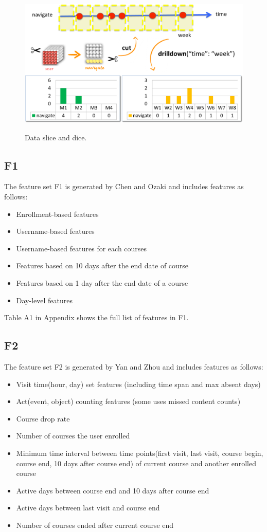 \begin{figure}[!t]
	\centering
	\includegraphics[width=0.5 \textwidth]{slice_and_dice}
	\label{fig:slice}
	\caption{Data slice and dice.}
\end{figure}

\subsection{F1}

The feature set F1 is generated by Chen and Ozaki and includes features as follows:

\begin{itemize}
  \setlength\itemsep{0em}
  \item Enrollment-based features 
  \item Username-based features 
  \item Username-based features for each courses 
  \item Features based on 10 days after the end date of course 
  \item Features based on 1 day after the end date of a course 
  \item Day-level features 
\end{itemize}

Table A1 in Appendix shows the full list of features in F1.

\subsection{F2}
The feature set F2 is generated by Yan and Zhou and includes features as follows:
\begin{itemize}
  \setlength\itemsep{0em}
  \item Visit time(hour, day) set features (including time span and max absent days)
  \item Act(event, object) counting features (some uses missed content counts)
  \item Course drop rate
  \item Number of courses the user enrolled
  \item Minimum time interval between time points(first visit, last visit, course begin, course end, 10 days after course end) of current course and another enrolled course
  \item Active days between course end and 10 days after course end
  \item Active days between last visit and course end
  \item Number of courses ended after current course end
\end{itemize}

